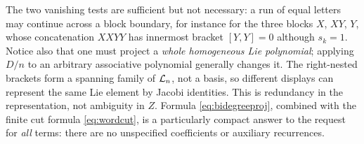 The two vanishing tests are sufficient but not necessary: a run of equal
letters may continue across a block boundary, for instance for the three
blocks $X$, $XY$, $Y$, whose concatenation $XXYY$ has innermost bracket
$[Y,Y]=0$ although $s_k=1$. Notice also that one must project a
\emph{whole homogeneous Lie polynomial}; applying $D/n$ to an arbitrary
associative polynomial generally changes it. The right-nested brackets form a
spanning family of $\mathcal{L}_n$, not a basis, so different displays can represent
the same Lie element by Jacobi identities. This is redundancy in the
representation, not ambiguity in $Z$. Formula \eqref{eq:bidegreeproj},
combined with the finite cut formula \eqref{eq:wordcut}, is a particularly
compact answer to the request for \emph{all} terms: there are no unspecified
coefficients or auxiliary recurrences.

